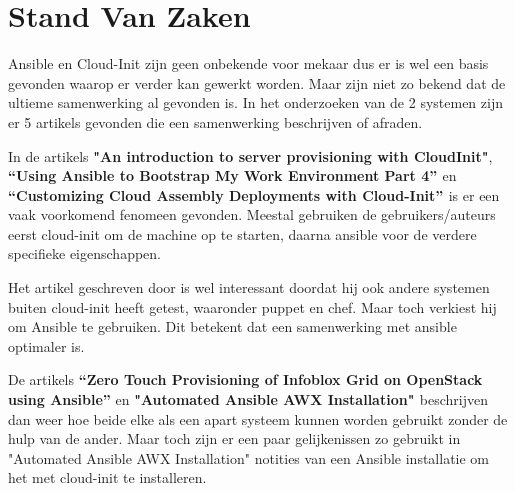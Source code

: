 



\section{Stand Van Zaken}
\label{sec:state-of-the-art}

Ansible en Cloud-Init zijn geen onbekende voor mekaar dus er is wel een basis gevonden waarop er verder kan gewerkt worden. Maar zijn niet zo bekend dat de ultieme samenwerking al gevonden is. In het onderzoeken van de 2 systemen zijn er 5 artikels gevonden die een samenwerking beschrijven of afraden. 


In de artikels \textbf{"An introduction to server provisioning with CloudInit"\autocite{Cloudsigma}}, \textbf{“Using Ansible to Bootstrap My Work Environment Part 4” \autocite{scottharney}} en \textbf{“Customizing Cloud Assembly Deployments with Cloud-Init” \autocite{vmware}} is er een vaak voorkomend fenomeen gevonden. Meestal gebruiken de gebruikers/auteurs eerst cloud-init om de machine op te starten, daarna ansible voor de verdere specifieke eigenschappen.


Het artikel geschreven door \textcite{Cloudsigma} is wel interessant doordat hij ook andere systemen buiten cloud-init heeft getest, waaronder puppet en chef. Maar toch verkiest hij om Ansible te gebruiken. Dit betekent dat een samenwerking met ansible optimaler is.


De artikels \textbf{“Zero Touch Provisioning of Infoblox Grid on OpenStack using Ansible”\autocite{infoblox}} en \textbf{"Automated Ansible AWX Installation" \autocite{deven}} beschrijven dan weer hoe beide elke als een apart systeem kunnen worden gebruikt zonder de hulp van de ander. Maar toch zijn er een paar gelijkenissen zo gebruikt \textcite{deven} in "Automated Ansible AWX Installation" notities van een Ansible installatie om het met cloud-init te installeren.


